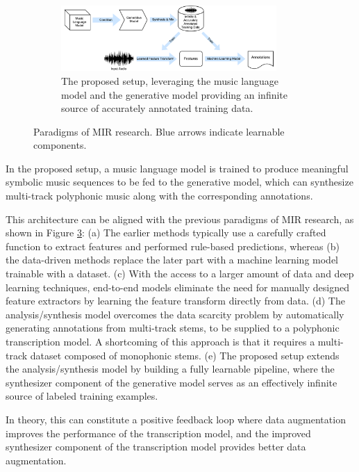 \begin{figure}
\begin{subfigure}[b]{\textwidth}
		\label{}
	\end{subfigure}
	\begin{subfigure}[b]{\textwidth}
		\centering
		\vspace{1em}
		\includegraphics[width=0.9\textwidth]{paradigms-5-proposed.pdf}
		\caption{The proposed setup, leveraging the music language model and the generative model providing an infinite source of accurately annotated training data.}
		\label{}
	\end{subfigure}
	\caption{Paradigms of MIR research. Blue arrows indicate learnable components.}
	\label{fig:paradigms}
\end{figure}


In the proposed setup, a music language model is trained to produce meaningful symbolic music sequences to be fed to the generative model, which can synthesize multi-track polyphonic music along with the corresponding annotations.

This architecture can be aligned with the previous paradigms of MIR research, as shown in Figure \ref{fig:paradigms}:
(a) The earlier methods typically use a carefully crafted function to extract features and performed rule-based predictions, whereas (b) the data-driven methods replace the later part with a machine learning model trainable with a dataset.
(c) With the access to a larger amount of data and deep learning techniques, end-to-end models eliminate the need for manually designed feature extractors by learning the feature transform directly from data.
(d) The analysis/synthesis model \cite{salamon2017analysis} overcomes the data scarcity problem by automatically generating annotations from multi-track stems, to be supplied to a polyphonic transcription model.
A shortcoming of this approach is that it requires a multi-track dataset composed of monophonic stems.
(e) The proposed setup extends the analysis/synthesis model by building a fully learnable pipeline, where the synthesizer component of the generative model serves as an effectively infinite source of labeled training examples.

In theory, this can constitute a positive feedback loop where data augmentation improves the performance of the transcription model, and the improved synthesizer component of the transcription model provides better data augmentation. 

